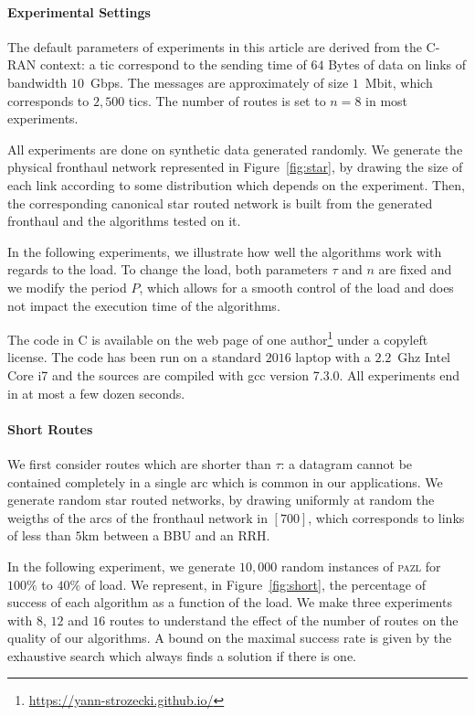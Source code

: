 \documentclass[a4paper,10pt]{article}
\newcommand\pazl{\textsc{pazl}\xspace}
\begin{document}
   \paragraph{Experimental Settings}

     The default parameters of experiments in this article are derived from the C-RAN context: a tic correspond to the sending time of $64$ Bytes of data on links of bandwidth $10$~Gbps. The messages are approximately of size $1$~Mbit, which corresponds to $2,500$ tics. The number of routes is set to $n = 8$ in most experiments. 

     All experiments are done on synthetic data generated randomly. We generate the physical fronthaul
     network represented in Figure~\ref{fig:star}, by drawing the size of each link according 
     to some distribution which depends on the experiment. Then, the corresponding canonical star routed network is built from the generated fronthaul and the algorithms tested on it. 

     In the following experiments, we illustrate how well the algorithms work with regards to the load. To change the load, both parameters $\tau$ and $n$ are fixed and we modify the period $P$, which allows for a smooth control of the load and does not impact the execution time of the algorithms.

     The code in C is available on the web page of one author\footnote{\url{https://yann-strozecki.github.io/}} under a copyleft license. The code has been run on a standard $2016$ laptop with a $2.2$~Ghz Intel Core i7 and the sources are compiled with gcc version 7.3.0. All experiments end in at most a few dozen seconds.

    \paragraph{Short Routes}
      
    

 	 We first consider routes which are shorter than $\tau$: a datagram cannot be contained completely in a single arc which is common in our applications. We generate random star routed networks, by drawing uniformly at random the weigths of the arcs of the fronthaul network in $[700]$, which corresponds to links of less than $5$km between a BBU and an RRH.

     In the following experiment, we generate $10,000$ random instances of \pazl for $100\%$ to $40\%$ of load. We represent, in Figure~\ref{fig:short}, the percentage of success of each algorithm as a function of the load. We make three experiments with $8$, $12$ and $16$ routes to understand the effect of the number of routes on the quality of our algorithms. A bound on the maximal success rate is given by the exhaustive search which always finds a solution if there is one. 
       
\end{document}
